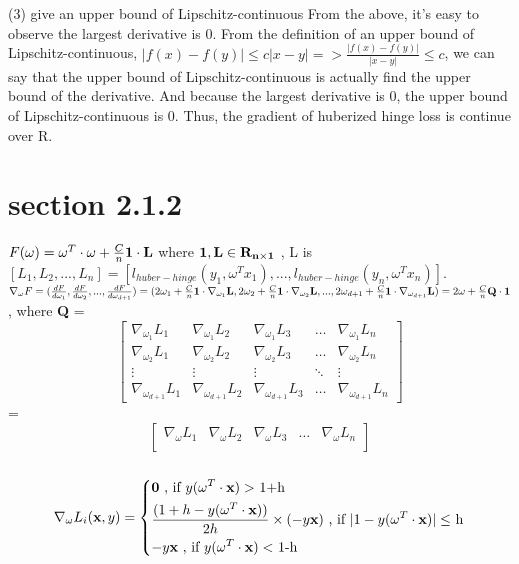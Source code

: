 \documentclass [12pt] {article}
\begin{document}
(3) give an upper bound of Lipschitz-continuous
From the above, it's easy to observe the largest derivative is 0. From the definition of an upper bound of Lipschitz-continuous, 
$|f(x) - f(y)| \leq c|x-y| => \frac{|f(x) - f(y)|}{|x-y|} \leq c$, we can say that the upper bound of Lipschitz-continuous is actually find the 
upper bound of the derivative. And because the largest derivative is 0, the upper bound of Lipschitz-continuous is 0. Thus, the gradient 
of huberized hinge loss is continue over R.

\section{section 2.1.2}
$F(\omega) = \omega^T \cdot \omega + \frac{C}{n} \bf{1} \cdot \bf{L}$ where $\bf{1}, \bf{L} \in R_{n \times 1}$ , L is \\ 
$ [L_1, L_2, ..., L_n] =  [l_{huber-hinge}(y_1, \omega^Tx_1), ... , l_{huber-hinge}(y_n, \omega^Tx_n) ]$. \\
$\nabla_{\omega} F = (\frac{dF}{d \omega_1}, \frac{dF}{d \omega_2}, ... , \frac{dF}{d \omega_{d+1}}) \\ = 
(2\omega_1+ \frac{C}{n} \textbf{1} \cdot \nabla_{\omega_1} \textbf{L}, 2\omega_2+ \frac{C}{n} \textbf{1} \cdot \nabla_{\omega_2}  \textbf{L}, ... , 2\omega_{d+1}+\frac{C}{n} \textbf{1} \cdot \nabla_{\omega_{d+1}} \textbf{L}) \\ = 
2\omega + \frac{C}{n} \textbf{Q} \cdot \textbf{1} $, where \textbf{Q} = 
\[
\begin{bmatrix}
    \nabla_{\omega_1}L_1 &  \nabla_{\omega_1}L_2 &  \nabla_{\omega_1}L_3 & \dots  &  \nabla_{\omega_1}L_n \\
    \nabla_{\omega_2}L_1 &  \nabla_{\omega_2}L_2 &  \nabla_{\omega_2}L_3 & \dots  &  \nabla_{\omega_2}L_n \\
    \vdots & \vdots & \vdots & \ddots & \vdots \\
   \nabla_{\omega_{d+1}}L_1 &  \nabla_{\omega_{d+1}}L_2 &  \nabla_{\omega_{d+1}}L_3 & \dots  &  \nabla_{\omega_{d+1}}L_n 
\end{bmatrix}
\]
= \\
\[
\begin{bmatrix}
    \nabla_{\omega}L_1 &  \nabla_{\omega}L_2 &  \nabla_{\omega}L_3 & \dots  &  \nabla_{\omega}L_n \\
\end{bmatrix}
\]
\\
\begin{equation}
\nabla_{\omega} L_i(\textbf{x},y) = \begin{dcases*}
				\textbf{0} \text{ , if $y(\omega^T \cdot \textbf{x}) >$ 1+h}  \\
				\frac{(1+h-y(\omega^T \cdot \textbf{x}))}{2h} \times (-y\textbf{x}) \text{ , if $|1-y(\omega^T \cdot \textbf{x})| \leq $ h} \\
				-y\textbf{x} \text{ , if $y(\omega^T \cdot \textbf{x}) <$ 1-h }
			   \end{dcases*}
\end{equation}
\end{document}

